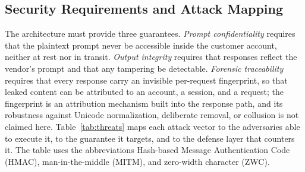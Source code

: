 \subsection{Security Requirements and Attack Mapping}

The architecture must provide three guarantees. \emph{Prompt confidentiality} requires that the plaintext prompt never be accessible inside the customer account, neither at rest nor in transit. \emph{Output integrity} requires that responses reflect the vendor's prompt and that any tampering be detectable. \emph{Forensic traceability} requires that every response carry an invisible per-request fingerprint, so that leaked content can be attributed to an account, a session, and a request; the fingerprint is an attribution mechanism built into the response path, and its robustness against Unicode normalization, deliberate removal, or collusion is not claimed here. Table~\ref{tab:threats} maps each attack vector to the adversaries able to execute it, to the guarantee it targets, and to the defense layer that counters it. The table uses the abbreviations Hash-based Message Authentication Code (HMAC), man-in-the-middle (MITM), and zero-width character (ZWC).

